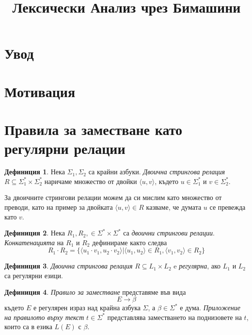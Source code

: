 \documentclass[12pt, oneside]{article}
\title{Лексически Анализ чрез Бимашини}
\theoremstyle{definition}
\newtheorem{definition}{Дефиниция}[section]
\begin{document}
\tableofcontents
\pagebreak

\section{Увод}

\section{Мотивация}

\section{Правила за заместване като регулярни релации}

\begin{definition}
	Нека \( \Sigma_1, \Sigma_2 \) са крайни азбуки. \emph{Двоична стрингова релация} \( R \subseteq \Sigma_1^* \times \Sigma_2^* \) наричаме множество от двойки \( \langle u, v \rangle \), където \( u \in \Sigma_1^* \) и \( v \in \Sigma_2^* \).
\end{definition}

За двоичните стрингови релации можем да си мислим като множество от преводи, като на пример за двойката \( \langle u, v \rangle \in R \) казваме, че думата \( u \) се превежда като \( v \).

\begin{definition}
	Нека \( R_1, R_2, \in \Sigma^* \times \Sigma^* \) са \emph{двоични стрингови релации}. \emph{Конкатенацията} на \( R_1 \) и \( R_2 \) дефинираме както следва
	\[ R_1 \cdot R_2 = \{ \langle u_1 \cdot v_1, u_2 \cdot v_2 \rangle | \langle u_1, u_2 \rangle \in R_1, \langle v_1, v_2 \rangle \in R_2 \} \]
\end{definition}

\begin{definition}
	\emph{Двоична стрингова релация} \( R \subseteq L_1 \times L_2 \) e \emph{регулярна}, ако \(L_1\) и \(L_2\) са регулярни езици.
\end{definition}

\begin{definition}
	\emph{Правило за заместване} представяме във вида
	\[ E \to \beta \]
	където \( E \) е регулярен израз над крайна азбука \( \Sigma \), а \( \beta \in \Sigma^* \) е дума.
	\emph{Приложение на правилото върху текст} \( t \in \Sigma^* \) представлява заместването на поднизовете на \( t \), които са в езика \( L(E) \) с \( \beta \).
\end{definition}
\end{document}
